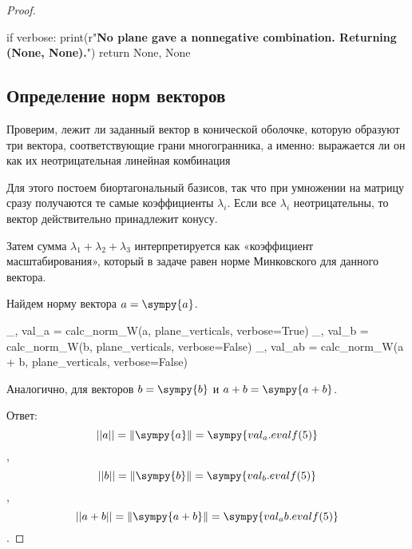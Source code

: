 \begin{proof}
\begin{sympycode}
    if verbose:
        print(r"\textbf{No plane gave a nonnegative combination. Returning (None, None).}")
    return None, None
\end{sympycode}

    \subsection*{Определение норм векторов}

    Проверим, лежит ли заданный вектор в конической оболочке,
    которую образуют три вектора, соответствующие грани многогранника, а именно: выражается ли он как их неотрицательная линейная комбинация

    Для этого постоем биортагональный базисов, так что при умножении на матрицу сразу получаются
    те самые коэффициенты \(\lambda_i\). Если все \(\lambda_i\) неотрицательны, 
    то вектор действительно принадлежит конусу.

    Затем сумма \(\lambda_1 + \lambda_2 + \lambda_3\) интерпретируется как «коэффициент масштабирования», 
    который в задаче равен норме Минковского для данного вектора.

    Найдем норму вектора \(a = \sympy{a}\).

    \begin{sympycode}
_, val_a = calc_norm_W(a, plane_verticals, verbose=True)
_, val_b = calc_norm_W(b, plane_verticals, verbose=False)
_, val_ab = calc_norm_W(a + b, plane_verticals, verbose=False)
\end{sympycode}

    Аналогично, для векторов \(b = \sympy{b}\) и \(a + b = \sympy{a + b}\).

    Ответ: \[||a|| = \left\Vert\sympy{a} \right\Vert = \sympy{val_a.evalf(5)}\],
    \[||b|| = \left\Vert\sympy{b} \right\Vert = \sympy{val_b.evalf(5)}\],
    \[||a+b|| = \left\Vert\sympy{a + b} \right\Vert = \sympy{val_ab.evalf(5)}\].
\end{proof}